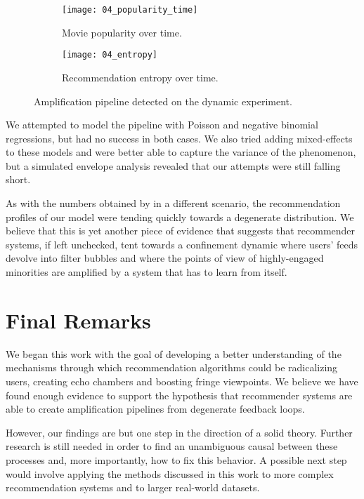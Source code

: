 \begin{figure}
  \centering
  \begin{subfigure}{0.45\textwidth}
    \centering
    \texttt{[image: 04\_popularity\_time]}
    \caption{Movie popularity over time.\label{fig:fig05_popularity_time}}
  \end{subfigure}
  \begin{subfigure}{0.45\textwidth}
    \centering
    \texttt{[image: 04\_entropy]}
    \caption{Recommendation entropy over time.\label{fig:fig05_entropy}}
  \end{subfigure}
  \caption{Amplification pipeline detected on the dynamic
  experiment.\label{fig:fig05_amplification}}
\end{figure}

We attempted to model the pipeline with Poisson and negative binomial
regressions, but had no success in both cases. We also tried adding
mixed-effects to these models and were better able to capture the variance of
the phenomenon, but a simulated envelope analysis revealed that our attempts
were still falling short.

As with the numbers obtained by \citet{} in a different scenario, the %
recommendation profiles of our model were tending quickly towards a degenerate
distribution. We believe that this is yet another piece of evidence that
suggests that recommender systems, if left unchecked, tent towards a confinement
dynamic where users' feeds devolve into filter bubbles and where the points of
view of highly-engaged minorities are amplified by a system that has to learn
from itself.

\section{Final Remarks}
\label{sec:remarks}

We began this work with the goal of developing a better understanding of the
mechanisms through which recommendation algorithms could be radicalizing users,
creating echo chambers and boosting fringe viewpoints. We believe we have found
enough evidence to support the hypothesis that recommender systems are able to
create amplification pipelines from degenerate feedback loops.

However, our findings are but one step in the direction of a solid theory.
Further research is still needed in order to find an unambiguous causal between
these processes and, more importantly, how to fix this behavior. A possible next
step would involve applying the methods discussed in this work to more complex
recommendation systems and to larger real-world datasets.
